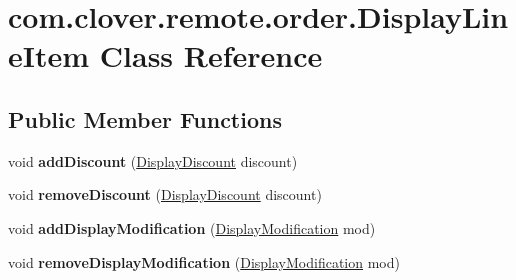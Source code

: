 \hypertarget{classcom_1_1clover_1_1remote_1_1order_1_1_display_line_item}{}\section{com.\+clover.\+remote.\+order.\+Display\+Line\+Item Class Reference}
\label{classcom_1_1clover_1_1remote_1_1order_1_1_display_line_item}
\subsection*{Public Member Functions}
\begin{DoxyCompactItemize}
\item 
\mbox{\label{classcom_1_1clover_1_1remote_1_1order_1_1_display_line_item_a2d8a47761b8424d56cb94ac9a2aeb2af}} 
void {\bfseries add\+Discount} (\hyperlink{classcom_1_1clover_1_1remote_1_1order_1_1_display_discount}{Display\+Discount} discount)
\item 
\mbox{\label{classcom_1_1clover_1_1remote_1_1order_1_1_display_line_item_a9c94a4841c4dfd5d761f6611c4bf9a19}} 
void {\bfseries remove\+Discount} (\hyperlink{classcom_1_1clover_1_1remote_1_1order_1_1_display_discount}{Display\+Discount} discount)
\item 
\mbox{\label{classcom_1_1clover_1_1remote_1_1order_1_1_display_line_item_a296f5145db032266d5ffa871a525e82f}} 
void {\bfseries add\+Display\+Modification} (\hyperlink{classcom_1_1clover_1_1remote_1_1order_1_1_display_modification}{Display\+Modification} mod)
\item 
\mbox{\label{classcom_1_1clover_1_1remote_1_1order_1_1_display_line_item_a86b9198436bf781235def3d95ecd0081}} 
void {\bfseries remove\+Display\+Modification} (\hyperlink{classcom_1_1clover_1_1remote_1_1order_1_1_display_modification}{Display\+Modification} mod)
\end{DoxyCompactItemize}
